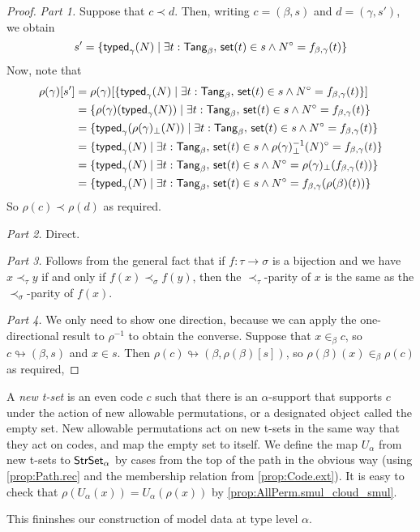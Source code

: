 \begin{proof}
  \emph{Part 1.}
  Suppose that \( c \prec d \).
  Then, writing \( c = (\beta, s) \) and \( d = (\gamma, s') \), we obtain
  \[ s' = \{ \operatorname{\mathsf{typed}}_\gamma(N) \mid \exists t : \mathsf{Tang}_\beta,\, \operatorname{\mathsf{set}}(t) \in s \wedge N^\circ = f_{\beta,\gamma}(t) \} \]
  Now, note that
  \begin{align*}
    \rho(\gamma)[s']
    &= \rho(\gamma)[\{ \operatorname{\mathsf{typed}}_\gamma(N) \mid \exists t : \mathsf{Tang}_\beta,\, \operatorname{\mathsf{set}}(t) \in s \wedge N^\circ = f_{\beta,\gamma}(t) \}] \\
    &= \{ \rho(\gamma)(\operatorname{\mathsf{typed}}_\gamma(N)) \mid \exists t : \mathsf{Tang}_\beta,\, \operatorname{\mathsf{set}}(t) \in s \wedge N^\circ = f_{\beta,\gamma}(t) \} \\
    &= \{ \operatorname{\mathsf{typed}}_\gamma(\rho(\gamma)_\bot(N)) \mid \exists t : \mathsf{Tang}_\beta,\, \operatorname{\mathsf{set}}(t) \in s \wedge N^\circ = f_{\beta,\gamma}(t) \} \\
    &= \{ \operatorname{\mathsf{typed}}_\gamma(N) \mid \exists t : \mathsf{Tang}_\beta,\, \operatorname{\mathsf{set}}(t) \in s \wedge \rho(\gamma)_\bot^{-1}(N)^\circ = f_{\beta,\gamma}(t) \} \\
    &= \{ \operatorname{\mathsf{typed}}_\gamma(N) \mid \exists t : \mathsf{Tang}_\beta,\, \operatorname{\mathsf{set}}(t) \in s \wedge N^\circ = \rho(\gamma)_\bot(f_{\beta,\gamma}(t)) \} \\
    &= \{ \operatorname{\mathsf{typed}}_\gamma(N) \mid \exists t : \mathsf{Tang}_\beta,\, \operatorname{\mathsf{set}}(t) \in s \wedge N^\circ = f_{\beta,\gamma}(\rho(\beta)(t)) \}
  \end{align*}
  So \( \rho(c) \prec \rho(d) \) as required.

  \emph{Part 2.}
  Direct.

  \emph{Part 3.}
  Follows from the general fact that if \( f : \tau \to \sigma \) is a bijection and we have \( x \prec_\tau y \) if and only if \( f(x) \prec_\sigma f(y) \), then the \( \prec_\tau \)-parity of \( x \) is the same as the \( \prec_\sigma \)-parity of \( f(x) \).

  \emph{Part 4.}
  We only need to show one direction, because we can apply the one-directional result to \( \rho^{-1} \) to obtain the converse.
  Suppose that \( x \in_\beta c \), so \( c \looparrowright (\beta, s) \) and \( x \in s \).
  Then \( \rho(c) \looparrowright (\beta, \rho(\beta)[s]) \), so \( \rho(\beta)(x) \in_\beta \rho(c) \) as required,
\end{proof}
\begin{definition}
  \label{def:NewTSet}
  A \emph{new t-set} is an even code \( c \) such that there is an \( \alpha \)-support that supports \( c \) under the action of new allowable permutations, or a designated object called the empty set.
  New allowable permutations act on new t-sets in the same way that they act on codes, and map the empty set to itself.
  We define the map \( U_\alpha \) from new t-sets to \( \mathsf{StrSet}_\alpha \) by cases from the top of the path in the obvious way (using \cref{prop:Path.rec} and the membership relation from \cref{prop:Code.ext}).
  It is easy to check that \( \rho(U_\alpha(x)) = U_\alpha(\rho(x)) \) by \cref{prop:AllPerm.smul_cloud_smul}.
\end{definition}
This fininshes our construction of model data at type level \( \alpha \).

